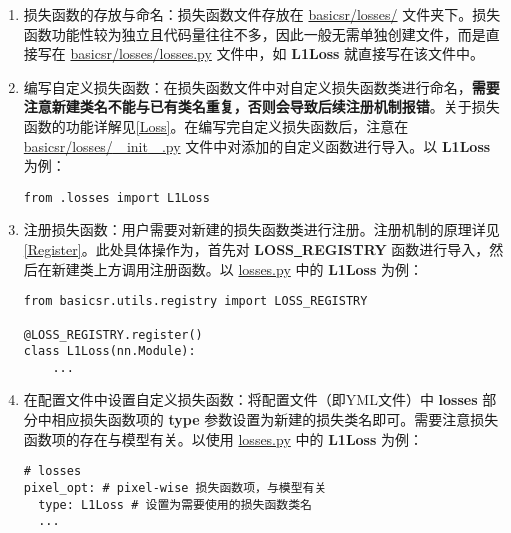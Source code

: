 \documentclass[../main.tex]{subfiles}
\begin{document}
\begin{enumerate}
    \item 损失函数的存放与命名：损失函数文件存放在 \href{https://github.com/XPixelGroup/BasicSR/tree/master/basicsr/losses}{basicsr/losses/} 文件夹下。损失函数功能性较为独立且代码量往往不多，因此一般无需单独创建文件，而是直接写在 \href{https://github.com/XPixelGroup/BasicSR/tree/master/basicsr/losses/losses.py}{basicsr/losses/losses.py} 文件中，如 \textbf{L1Loss} 就直接写在该文件中。

    \item 编写自定义损失函数：在损失函数文件中对自定义损失函数类进行命名，\textbf{需要注意新建类名不能与已有类名重复，否则会导致后续注册机制报错}。关于损失函数的功能详解见\ref{Loss}。在编写完自定义损失函数后，注意在 \href{https://github.com/XPixelGroup/BasicSR/tree/master/basicsr/losses/__init__.py}{basicsr/losses/\underline{~~}init\underline{~~}.py} 文件中对添加的自定义函数进行导入。以 \textbf{L1Loss} 为例：
          \begin{verbatim}
from .losses import L1Loss
\end{verbatim}

    \item 注册损失函数：用户需要对新建的损失函数类进行注册。注册机制的原理详见\ref{Register}。此处具体操作为，首先对 \textbf{LOSS\underline{~}REGISTRY} 函数进行导入，然后在新建类上方调用注册函数。以 \href{https://github.com/XPixelGroup/BasicSR/tree/master/basicsr/losses/losses.py}{losses.py} 中的 \textbf{L1Loss} 为例：
          \begin{verbatim}
from basicsr.utils.registry import LOSS_REGISTRY

@LOSS_REGISTRY.register()
class L1Loss(nn.Module):
    ...
\end{verbatim}

    \item 在配置文件中设置自定义损失函数：将配置文件（即YML文件）中 \textbf{losses} 部分中相应损失函数项的 \textbf{type} 参数设置为新建的损失类名即可。需要注意损失函数项的存在与模型有关。以使用 \href{https://github.com/XPixelGroup/BasicSR/tree/master/basicsr/losses/losses.py}{losses.py} 中的 \textbf{L1Loss} 为例：
          \begin{verbatim}
# losses
pixel_opt: # pixel-wise 损失函数项，与模型有关
  type: L1Loss # 设置为需要使用的损失函数类名
  ...
\end{verbatim}
\end{enumerate}
\end{document}
